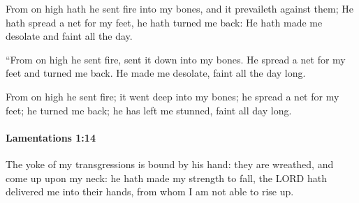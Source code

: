 			\begin{versebox}
					\item[BHS] 
					\item[LXX] 
					\item[ASV] From on high hath he sent fire into my bones, and it prevaileth against them; He hath spread a net for my feet, he hath turned me back: He hath made me desolate and faint all the day.
					\item[NIV] “From on high he sent fire, sent it down into my bones. He spread a net for my feet and turned me back. He made me desolate, faint all the day long.
					\item[NRSV] From on high he sent fire; it went deep into my bones; he spread a net for my feet; he turned me back; he has left me stunned, faint all day long.
			\end{versebox}

		\paragraph{Lamentations 1:14} %
			\label{LAMENTATIONS-1-14}

			The yoke of my transgressions is bound by his hand: they are wreathed, and come up upon my neck: he hath made my strength to fall, the LORD hath delivered me into their hands, from whom I am not able to rise up.

